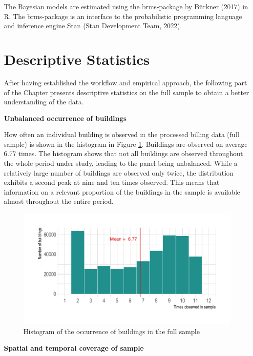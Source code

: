 \documentclass[12pt,twoside]{reedthesis}
\begin{document}
The Bayesian models are estimated using the brms-package by \protect\hyperlink{ref-burkner17}{Bürkner} (\protect\hyperlink{ref-burkner17}{2017}) in R. The brms-package is an interface to the probabilistic programming language and inference engine Stan (\protect\hyperlink{ref-standevelopmentteam22}{Stan Development Team, 2022}).

\hypertarget{descriptives}{%
\section{Descriptive Statistics}\label{descriptives}}

After having established the workflow and empirical approach, the following part of the Chapter presents descriptive statistics on the full sample to obtain a better understanding of the data.

\textbf{Unbalanced occurrence of buildings}

How often an individual building is observed in the processed billing data (full sample) is shown in the histogram in Figure \ref{fig:occurrence-buildings}. Buildings are observed on average 6.77 times. The histogram shows that not all buildings are observed throughout the whole period under study, leading to the panel being unbalanced. While a relatively large number of buildings are observed only twice, the distribution exhibits a second peak at nine and ten times observed. This means that information on a relevant proportion of the buildings in the sample is available almost throughout the entire period.
\begin{figure}

{\centering \includegraphics[width=0.75\linewidth]{figure/occurance_buildings} 

}

\caption{Histogram of the occurrence of buildings in the full sample}\label{fig:occurrence-buildings}
\end{figure}
\textbf{Spatial and temporal coverage of sample}
\end{document}
